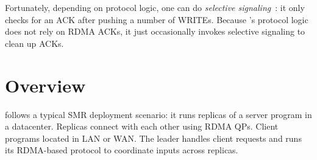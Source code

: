 Fortunately, depending on protocol logic, one can do \emph{selective 
signaling}~\cite{herd:sigcomm14}: it only checks for an ACK after pushing a 
number of WRITEs. Because \xxx's protocol logic does not rely on RDMA ACKs, 
it just occasionally invokes selective signaling to clean up ACKs.



\section{\xxx Overview}\label{sec:overview}

 





\xxx follows a typical SMR deployment scenario: it runs replicas of a server 
program in a datacenter. Replicas 
connect with each other using RDMA QPs. Client programs located in LAN or WAN. 
The \xxx leader handles client requests and runs its RDMA-based 
protocol to coordinate inputs across replicas.

